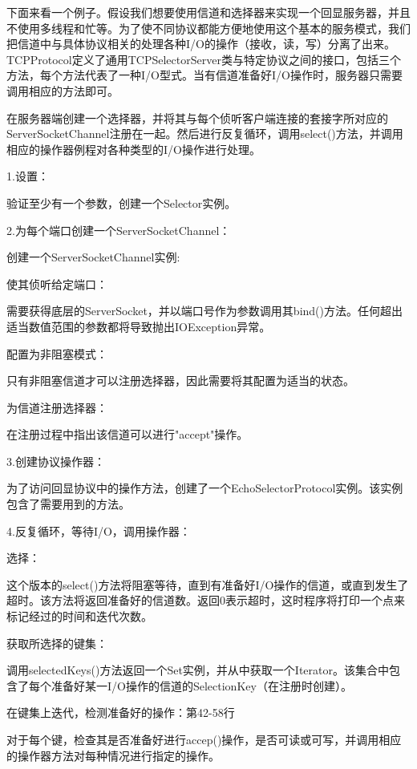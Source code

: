 	下面来看一个例子。假设我们想要使用信道和选择器来实现一个回显服务器，并且不使用多线程和忙等。为了使不同协议都能方便地使用这个基本的服务模式，我们把信道中与具体协议相关的处理各种I/O的操作（接收，读，写）分离了出来。TCPProtocol定义了通用TCPSelectorServer类与特定协议之间的接口，包括三个方法，每个方法代表了一种I/O型式。当有信道准备好I/O操作时，服务器只需要调用相应的方法即可。 

	

	在服务器端创建一个选择器，并将其与每个侦听客户端连接的套接字所对应的ServerSocketChannel注册在一起。然后进行反复循环，调用select()方法，并调用相应的操作器例程对各种类型的I/O操作进行处理。 

	

	1.设置：

	验证至少有一个参数，创建一个Selector实例。 

	2.为每个端口创建一个ServerSocketChannel：

	创建一个ServerSocketChannel实例:

	使其侦听给定端口：

	需要获得底层的ServerSocket，并以端口号作为参数调用其bind()方法。任何超出适当数值范围的参数都将导致抛出IOException异常。 

	配置为非阻塞模式：

	只有非阻塞信道才可以注册选择器，因此需要将其配置为适当的状态。 

	为信道注册选择器：

	在注册过程中指出该信道可以进行"accept"操作。 

	3.创建协议操作器：

	为了访问回显协议中的操作方法，创建了一个EchoSelectorProtocol实例。该实例包含了需要用到的方法。 

	4.反复循环，等待I/O，调用操作器：

	选择：

	这个版本的select()方法将阻塞等待，直到有准备好I/O操作的信道，或直到发生了超时。该方法将返回准备好的信道数。返回0表示超时，这时程序将打印一个点来标记经过的时间和迭代次数。 

	获取所选择的键集：

	调用selectedKeys()方法返回一个Set实例，并从中获取一个Iterator。该集合中包含了每个准备好某一I/O操作的信道的SelectionKey（在注册时创建）。 

	在键集上迭代，检测准备好的操作：第42-58行 

	对于每个键，检查其是否准备好进行accep()操作，是否可读或可写，并调用相应的操作器方法对每种情况进行指定的操作。 


